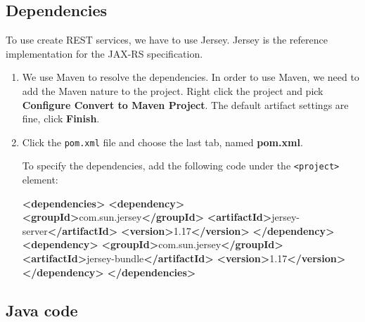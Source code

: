 \documentclass[]{report}
\newenvironment{Shaded}{}{}
\newcommand{\KeywordTok}[1]{\textcolor[rgb]{0.00,0.44,0.13}{\textbf{{#1}}}}
\newcommand{\NormalTok}[1]{{#1}}
\begin{document}
\subsection{Dependencies}

To use create REST services, we have to use Jersey. Jersey is the
reference implementation for the JAX-RS specification.

\begin{enumerate}
\def\labelenumi{\arabic{enumi}.}
\item
  We use Maven to resolve the dependencies. In order to use Maven, we
  need to add the Maven nature to the project. Right click the project
  and pick \textbf{Configure \textbar{} Convert to Maven Project}. The
  default artifact settings are fine, click \textbf{Finish}.
\item
  Click the \texttt{pom.xml} file and choose the last tab, named
  \textbf{pom.xml}.

  To specify the dependencies, add the following code under the
  \texttt{\textless{}project\textgreater{}} element:

\begin{Shaded}
\begin{Highlighting}[]
\KeywordTok{<dependencies>}
  \KeywordTok{<dependency>}
    \KeywordTok{<groupId>}\NormalTok{com.sun.jersey}\KeywordTok{</groupId>}
    \KeywordTok{<artifactId>}\NormalTok{jersey-server}\KeywordTok{</artifactId>}
    \KeywordTok{<version>}\NormalTok{1.17}\KeywordTok{</version>}
  \KeywordTok{</dependency>}
  \KeywordTok{<dependency>}
    \KeywordTok{<groupId>}\NormalTok{com.sun.jersey}\KeywordTok{</groupId>}
    \KeywordTok{<artifactId>}\NormalTok{jersey-bundle}\KeywordTok{</artifactId>}
    \KeywordTok{<version>}\NormalTok{1.17}\KeywordTok{</version>}
  \KeywordTok{</dependency>}
\KeywordTok{</dependencies>}
\end{Highlighting}
\end{Shaded}
\end{enumerate}

\subsection{Java code}
\end{document}
